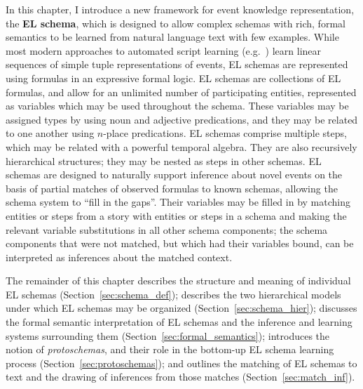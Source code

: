 
In this chapter, I introduce a new framework for event knowledge representation, the \textbf{EL schema}, which is designed to allow complex schemas with rich, formal semantics to be learned from natural language text with few examples.
While most modern approaches to automated script learning (e.g.~\cite{chambers2011ACL,pichotta2016WS,yuan2018OEP}) learn linear sequences of simple tuple representations of events, EL schemas are represented using formulas in an expressive formal logic.
EL schemas are collections of EL formulas, and allow for an unlimited number of participating entities, represented as variables which may be used throughout the schema.
These variables may be assigned types by using noun and adjective predications, and they may be related to one another using $n$-place predications.
EL schemas comprise multiple steps, which may be related with a powerful temporal algebra.
They are also recursively hierarchical structures; they may be nested as steps in other schemas. EL schemas are designed to naturally support inference about novel events on the basis of partial matches of observed formulas to known schemas, allowing the schema system to ``fill in the gaps''.
Their variables may be filled in by matching entities or steps from a story with entities or steps in a schema and making the relevant variable substitutions in all other schema components; the schema components that were not matched, but which had their variables bound, can be interpreted as inferences about the matched context.

The remainder of this chapter describes the structure and meaning of individual EL schemas (Section~\ref{sec:schema_def}); describes the two hierarchical models under which EL schemas may be organized (Section~\ref{sec:schema_hier}); discusses the formal semantic interpretation of EL schemas and the inference and learning systems surrounding them (Section~\ref{sec:formal_semantics}); introduces the notion of \textit{protoschemas}, and their role in the bottom-up EL schema learning process (Section~\ref{sec:protoschemas}); and outlines the matching of EL schemas to text and the drawing of inferences from those matches (Section~\ref{sec:match_inf}).

